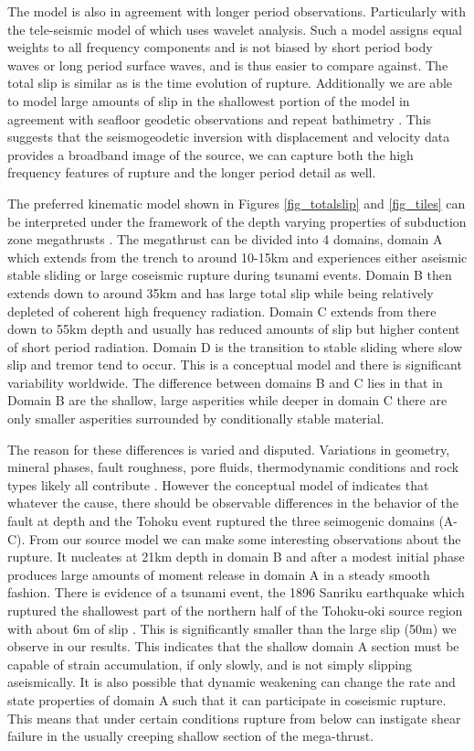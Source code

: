 The model is also in agreement with longer period observations. Particularly with the tele-seismic model of \citet{shao2011} which uses wavelet analysis. Such a model assigns equal weights to all frequency components and is not biased by short period body waves or long period surface waves, and is thus easier to compare against. The total slip is similar as is the time evolution of rupture. Additionally we are able to model large amounts of slip in the shallowest portion of the model in agreement with seafloor geodetic observations and repeat bathimetry \citep{fujiwara2011,sato2011}. This suggests that the seismogeodetic inversion with displacement and velocity data provides a broadband image of the source, we can capture both the high frequency features of rupture and the longer period detail as well.

The preferred kinematic model shown in Figures \ref{fig_totalslip} and \ref{fig_tiles} can be interpreted under the framework of the depth varying properties of subduction zone megathrusts \citep{lay2012}. The megathrust can be divided into 4 domains, domain A which extends from the trench to around 10-15km and experiences either aseismic stable sliding or large coseismic rupture during tsunami events. Domain B then extends down to around 35km and has large total slip while being relatively depleted of coherent high frequency radiation. Domain C extends from there down to 55km depth and usually has reduced amounts of slip but higher content of short period radiation. Domain D is the transition to stable sliding where slow slip and tremor tend to occur. This is a conceptual model and there is significant variability worldwide. The difference between domains B and C lies in that in Domain B are the shallow, large asperities while deeper in domain C there are only smaller asperities surrounded by conditionally stable material.

The reason for these differences is varied and disputed. Variations in geometry, mineral phases, fault roughness, pore fluids, thermodynamic conditions and rock types likely all contribute \citep{heuret2011}. However the conceptual model of \citep{lay2012} indicates that whatever the cause, there should be observable differences in the behavior of the fault at depth and the Tohoku event ruptured the three seimogenic domains (A-C). From our source model we can make some interesting observations about the rupture. It nucleates at 21km depth in domain B and after a modest initial phase produces large amounts of moment release in domain A in a steady smooth fashion. There is evidence of a tsunami event, the 1896 Sanriku earthquake which ruptured the shallowest part of the northern half of the Tohoku-oki source region with about 6m of slip \citep{tanioka1996}. This is significantly smaller than the large slip (50m) we observe in our results. This indicates that the shallow domain A section must be capable of strain accumulation, if only slowly, and is not simply slipping aseismically. It is also possible that dynamic weakening can change the rate and state properties of domain A \citep{noda2013} such that it can participate in coseismic rupture. This means that under certain conditions rupture from below can instigate shear failure in the usually creeping shallow section of the mega-thrust.

